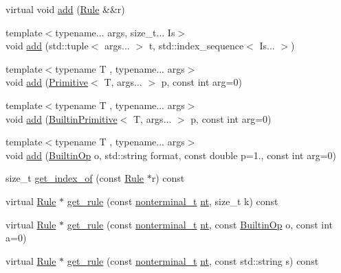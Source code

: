 \begin{DoxyCompactItemize}
\item 
virtual void \hyperlink{class_grammar_a0be4926e40ea476152a5a87a1c83f167}{add} (\hyperlink{class_rule}{Rule} \&\&r)
\item 
{\footnotesize template$<$typename... args, size\+\_\+t... Is$>$ }\\void \hyperlink{class_grammar_a3c4f41d4b1ff3c9973cb13ccea2c57fb}{add} (std\+::tuple$<$ args... $>$ t, std\+::index\+\_\+sequence$<$ Is... $>$)
\item 
{\footnotesize template$<$typename T , typename... args$>$ }\\void \hyperlink{class_grammar_a86dfa9ce87af1779799e617bb3252220}{add} (\hyperlink{struct_primitive}{Primitive}$<$ T, args... $>$ p, const int arg=0)
\item 
{\footnotesize template$<$typename T , typename... args$>$ }\\void \hyperlink{class_grammar_a52b751ef5987563d4045692199dba16c}{add} (\hyperlink{struct_builtin_primitive}{Builtin\+Primitive}$<$ T, args... $>$ p, const int arg=0)
\item 
{\footnotesize template$<$typename T , typename... args$>$ }\\void \hyperlink{class_grammar_ada3a7374f7aa01a1db5b938e8b9dfa2d}{add} (\hyperlink{_instruction_8h_af2fb7c87c5854c5733d7bb0506b06de7}{Builtin\+Op} o, std\+::string format, const double p=1., const int arg=0)
\item 
size\+\_\+t \hyperlink{class_grammar_a16885c3de4a6e3fd31ddab136cd9fea8}{get\+\_\+index\+\_\+of} (const \hyperlink{class_rule}{Rule} $\ast$r) const
\item 
virtual \hyperlink{class_rule}{Rule} $\ast$ \hyperlink{class_grammar_a9ed04fb2a2a8e2f0e4f11b711647a02c}{get\+\_\+rule} (const \hyperlink{_nonterminal_8h_a5c1f658dc7560600a16d22408bd716ca}{nonterminal\+\_\+t} \hyperlink{class_grammar_a047b55bfbd87c52e9d969af62c2932ab}{nt}, size\+\_\+t k) const
\item 
virtual \hyperlink{class_rule}{Rule} $\ast$ \hyperlink{class_grammar_a57835af24b91d1c193f2906b43282350}{get\+\_\+rule} (const \hyperlink{_nonterminal_8h_a5c1f658dc7560600a16d22408bd716ca}{nonterminal\+\_\+t} \hyperlink{class_grammar_a047b55bfbd87c52e9d969af62c2932ab}{nt}, const \hyperlink{_instruction_8h_af2fb7c87c5854c5733d7bb0506b06de7}{Builtin\+Op} o, const int a=0)
\item 
virtual \hyperlink{class_rule}{Rule} $\ast$ \hyperlink{class_grammar_a3d13aad0e640f20e9eb7d0d148915576}{get\+\_\+rule} (const \hyperlink{_nonterminal_8h_a5c1f658dc7560600a16d22408bd716ca}{nonterminal\+\_\+t} \hyperlink{class_grammar_a047b55bfbd87c52e9d969af62c2932ab}{nt}, const std\+::string s) const

\end{DoxyCompactItemize}
